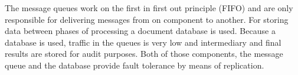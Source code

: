 The message queues work on the first in first out principle (FIFO) and are only responsible for delivering messages from on component to another. For storing data between phases of processing a document database is used. 
Because a database is used, traffic in the queues is very low and intermediary and final results are stored for audit purposes. Both of those components, the message queue and the database provide fault tolerance by means of replication.





